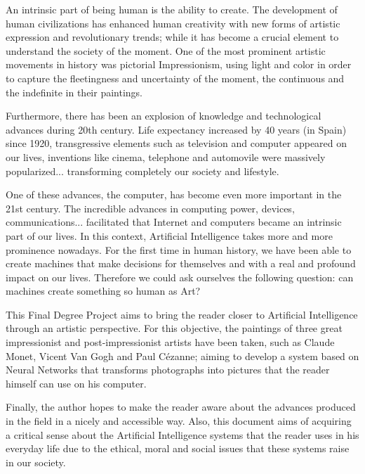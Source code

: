 \documentclass[a4paper]{report}
\begin{document}
An intrinsic part of being human is the ability to create. The development of human civilizations has enhanced human creativity with new forms of artistic expression and revolutionary trends; while it has become a crucial element to understand the society of the moment. One of the most prominent artistic movements in history was pictorial Impressionism, using light and color in order to capture the fleetingness and uncertainty of the moment, the continuous and the indefinite in their paintings. \newline

Furthermore, there has been an explosion of knowledge and technological advances during 20th century. Life expectancy increased by 40 years (in Spain) since 1920, transgressive elements such as television and computer appeared on our lives, inventions like cinema, telephone and automovile were massively popularized... transforming completely our society and lifestyle. \newline

One of these advances, the computer, has become even more important in the 21st century. The incredible advances in computing power, devices, communications... facilitated that Internet and computers became an intrinsic part of our lives. In this context, Artificial Intelligence takes more and more prominence nowadays. For the first time in human history, we have been able to create machines that make decisions for themselves and with a real and profound impact on our lives. Therefore we could ask ourselves the following question: can machines create something so human as Art? \newline

This Final Degree Project aims to bring the reader closer to Artificial Intelligence through an artistic perspective. For this objective, the paintings of three great impressionist and post-impressionist artists have been taken, such as Claude Monet, Vicent Van Gogh and Paul Cézanne; aiming to develop a system based on Neural Networks that transforms photographs into pictures that the reader himself can use on his computer. \newline

Finally, the author hopes to make the reader aware about the advances produced in the field in a nicely and accessible way. Also, this document aims of acquiring a critical sense about the Artificial Intelligence systems that the reader uses in his everyday life due to the ethical, moral and social issues that these systems raise in our society. \newline
\end{document}
